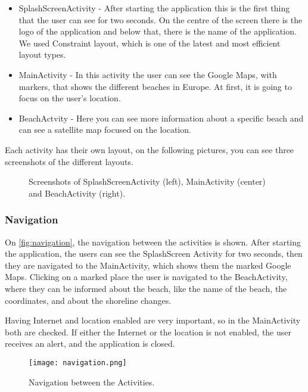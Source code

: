 \begin{itemize}
    \item SplashScreenActivity - After starting the application this is the first thing that the user can see for two seconds. On the centre of the screen there is the logo of the application and below that, there is the name of the application. We used Constraint layout, which is one of the latest and most efficient layout types.
    \item MainActivity - In this activity the user can see the Google Maps, with markers, that shows the different beaches in Europe. At first, it is going to focus on the user’s location.
    \item BeachActvity - Here you can see more information about a specific beach and can see a satellite map focused on the location.
\end{itemize}

Each activity has their own layout, on the following pictures, you can see three screenshots of the different layouts.


\begin{figure}[h!]
    \centering
    \caption{Screenshots of SplashScreenActivity (left), MainActivity (center) and BeachActivity (right).}
    \label{fig:activities}
\end{figure}

\subsubsection{Navigation}

On \autoref{fig:navigation}, the navigation between the activities is shown. After starting the application, the users can see the SplashScreen Activity for two seconds, then they are navigated to the MainActivity, which shows them the marked Google Maps. Clicking on a marked place the user is navigated to the BeachActivity, where they can be informed about the beach, like the name of the beach, the coordinates, and about the shoreline changes.

Having Internet and location enabled are very important, so in the MainActivity both are checked. If either the Internet or the location is not enabled, the user receives an alert, and the application is closed.

\begin{figure}[H]
    \centering
    \texttt{[image: navigation.png]}
    \caption{Navigation between the Activities.}
    \label{fig:navigation}
\end{figure}

